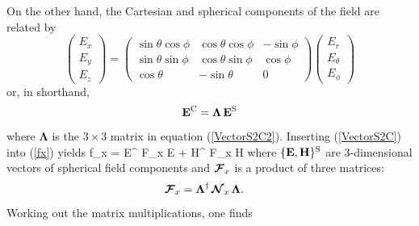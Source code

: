 \documentclass[letterpaper]{article}
\begin{document}
On the other hand, the Cartesian and spherical components of the field
are related by 
\begin{equation} 
\left(\begin{array}{c} E_x \\ E_y \\ E_z \end{array}\right)
=
\left(\begin{array}{ccc}
\sin\theta\cos\phi & 
\cos\theta\cos\phi & 
-\sin\phi
\\
\sin\theta\sin\phi & 
\cos\theta\sin\phi & 
\cos\phi
\\
\cos\theta         &
-\sin\theta        &
0
\end{array}\right)
\left(\begin{array}{c} E_r \\ E_\theta \\ E_\phi\end{array}\right)
\label{VectorS2C}
\end{equation}
or, in shorthand, 
\begin{equation}
 \mathbf{E}^{\text{\scriptsize C}} = \boldsymbol{\Lambda} \, \mathbf{E}^{\text{\scriptsize S}}
\label{VectorS2C2}
\end{equation} 
where $\boldsymbol{\Lambda}$ is the $3\times 3$ matrix 
in equation (\ref{VectorS2C2}). Inserting (\ref{VectorS2C}) into 
(\ref{fx}) yields
{
 f_x  
=  \vb E^{\dagger} \bmc F_x \vb E
 + \vb H^{\dagger} \bmc F_x \vb H
}
where $\{\mathbf{E}, \mathbf{H}\}^{\text{\scriptsize S}}$ are 3-dimensional vectors of spherical
field components and $\boldsymbol{\mathcal{F}}_x$ is a product of three matrices:
\begin{align*}
\boldsymbol{\mathcal{F}}_x&=\boldsymbol{\Lambda}^\dagger \, \boldsymbol{\mathcal{N}}_x \, \boldsymbol{\Lambda}.
\end{align*}
Working out the matrix multiplications, one finds
\end{document}
